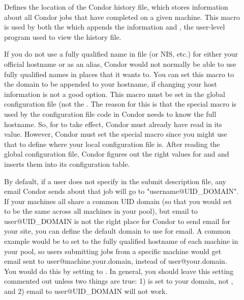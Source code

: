 \begin{description}
\item[] \label{param:History} Defines the
  location of the Condor history file, which stores information about
  all Condor jobs that have completed on a given machine.  This macro
  is used by both the  which appends the information
  and , the user-level program used to view
  the history file.

\item[] \label{param:DefaultDomainName}
  If you do not use a fully qualified name in file 
  (or NIS, etc.) for either your official hostname or as an
  alias, Condor would not normally be able to use fully qualified names
  in places that it wants to.  You can set this macro to the
  domain to be appended to your hostname, if changing your host
  information is not a good option.  This macro must be set in the
  global configuration file (not the .
  The reason for this is that the special 
  macro is used by the configuration file code in Condor needs
  to know the full hostname.  So, for  to
  take effect, Condor must already have read in its value.  However,
  Condor must set the  special macro since you
  might use that to define where your local configuration file is.  After
  reading the global configuration file, Condor figures out the right values
  for  and  and inserts them
  into its configuration table.

\item[] \label{param:EmailDomain}
  By default, if a user does not specify  in the
  submit description file, any email Condor sends about that job will
  go to "username@UID\_DOMAIN".
  If your machines all share a common UID domain (so that you would
  set  to be the same across all machines in your
  pool), but email to user@UID\_DOMAIN is not the right place for
  Condor to send email for your site, you can define the default
  domain to use for email.
  A common example would be to set  to the fully
  qualified hostname of each machine in your pool, so users submitting
  jobs from a specific machine would get email sent to
  user@machine.your.domain, instead of user@your.domain.  
  You would do this by setting  to
  . 
  In general, you should leave this setting commented out unless two
  things are true: 1)  is set to your domain, not
  , and 2) email to user@UID\_DOMAIN will not 
  work. 


\end{description}
